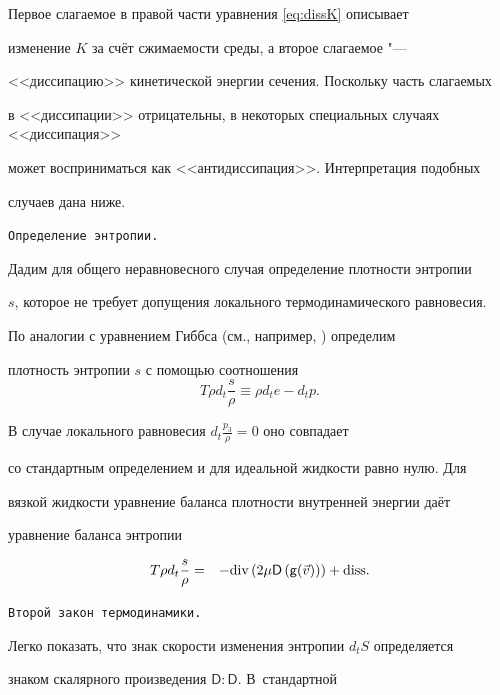 Первое слагаемое в правой части уравнения \eqref{eq:dissK} описывает

изменение $K$ за счёт сжимаемости среды, а второе слагаемое "--- 

<<диссипацию>> кинетической энергии сечения. Поскольку часть слагаемых

в <<диссипации>> отрицательны, в некоторых специальных случаях <<диссипация>>

может восприниматься как <<антидиссипация>>. Интерпретация подобных

случаев дана ниже.



\smallskip






{\tt Определение энтропии.}

Дадим для общего неравновесного случая определение плотности энтропии

$s$, которое не требует допущения локального термодинамического равновесия.

По аналогии с уравнением Гиббса (см., например, \cite{Gy74}) определим

плотность энтропии $s$ с помощью соотношения $$T\rho d_{t}\frac{s}{\rho}\equiv\rho d_{t}e-d_{t}p.$$

В случае локального равновесия $d_{t}\frac{p_{3}}{\rho}=0$ оно совпадает 

со стандартным определением и для идеальной жидкости равно нулю. Для

вязкой жидкости уравнение баланса плотности внутренней энергии даёт

уравнение баланса энтропии

\begin{eqnarray*}

T\rho d_{t}\frac{s}{\rho} & = & -\textnormal{div}\left(2\mu\mathsf{D}\left(\mathsf{g}(\vec{v})\right)\right)+\textrm{diss}.

\end{eqnarray*}



\smallskip



{\tt Второй закон термодинамики.}

Легко показать, что знак скорости изменения энтропии $d_{t}S$ определяется

знаком скалярного произведения $\mathsf{D}:\mathsf{D}$. В~стандартной

